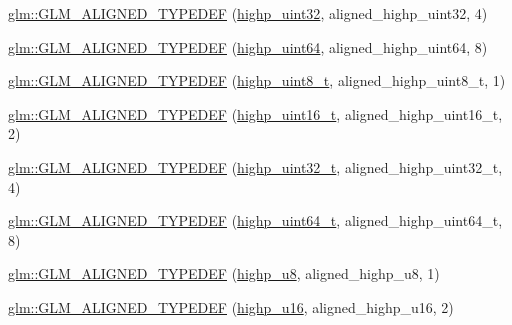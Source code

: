 \begin{DoxyCompactItemize}
\hyperlink{group__gtx__type__aligned_ga6027ae13b2734f542a6e7beee11b8820}{glm\+::\+G\+L\+M\+\_\+\+A\+L\+I\+G\+N\+E\+D\+\_\+\+T\+Y\+P\+E\+D\+EF} (\hyperlink{group__gtc__type__precision_ga3145e44c73e2df7dfe4f3cb65974bf22}{highp\+\_\+uint32}, aligned\+\_\+highp\+\_\+uint32, 4)
\item 
\hyperlink{group__gtx__type__aligned_ga2aca46c8608c95ef991ee4c332acde5f}{glm\+::\+G\+L\+M\+\_\+\+A\+L\+I\+G\+N\+E\+D\+\_\+\+T\+Y\+P\+E\+D\+EF} (\hyperlink{group__gtc__type__precision_ga8079c653e20cda03d34b99de629a7b09}{highp\+\_\+uint64}, aligned\+\_\+highp\+\_\+uint64, 8)
\item 
\hyperlink{group__gtx__type__aligned_gaff50b10dd1c48be324fdaffd18e2c7ea}{glm\+::\+G\+L\+M\+\_\+\+A\+L\+I\+G\+N\+E\+D\+\_\+\+T\+Y\+P\+E\+D\+EF} (\hyperlink{group__gtc__type__precision_ga9ba529fcc75b82d23da979f0ce6e4518}{highp\+\_\+uint8\+\_\+t}, aligned\+\_\+highp\+\_\+uint8\+\_\+t, 1)
\item 
\hyperlink{group__gtx__type__aligned_ga9fc4421dbb833d5461e6d4e59dcfde55}{glm\+::\+G\+L\+M\+\_\+\+A\+L\+I\+G\+N\+E\+D\+\_\+\+T\+Y\+P\+E\+D\+EF} (\hyperlink{group__gtc__type__precision_ga3145bc0ee80432c165e985a188a722b3}{highp\+\_\+uint16\+\_\+t}, aligned\+\_\+highp\+\_\+uint16\+\_\+t, 2)
\item 
\hyperlink{group__gtx__type__aligned_ga329f1e2b94b33ba5e3918197030bcf03}{glm\+::\+G\+L\+M\+\_\+\+A\+L\+I\+G\+N\+E\+D\+\_\+\+T\+Y\+P\+E\+D\+EF} (\hyperlink{group__gtc__type__precision_ga8eb85ad460079c63b68866ae34637bda}{highp\+\_\+uint32\+\_\+t}, aligned\+\_\+highp\+\_\+uint32\+\_\+t, 4)
\item 
\hyperlink{group__gtx__type__aligned_ga71e646f7e301aa422328194162c9c998}{glm\+::\+G\+L\+M\+\_\+\+A\+L\+I\+G\+N\+E\+D\+\_\+\+T\+Y\+P\+E\+D\+EF} (\hyperlink{group__gtc__type__precision_ga6e66f40c5909bfc872b068187fa6029e}{highp\+\_\+uint64\+\_\+t}, aligned\+\_\+highp\+\_\+uint64\+\_\+t, 8)
\item 
\hyperlink{group__gtx__type__aligned_ga8942e09f479489441a7a5004c6d8cb66}{glm\+::\+G\+L\+M\+\_\+\+A\+L\+I\+G\+N\+E\+D\+\_\+\+T\+Y\+P\+E\+D\+EF} (\hyperlink{group__gtc__type__precision_ga8a60abe782749c504fb5ae51eb8b49cc}{highp\+\_\+u8}, aligned\+\_\+highp\+\_\+u8, 1)
\item 
\hyperlink{group__gtx__type__aligned_gaab32497d6e4db16ee439dbedd64c5865}{glm\+::\+G\+L\+M\+\_\+\+A\+L\+I\+G\+N\+E\+D\+\_\+\+T\+Y\+P\+E\+D\+EF} (\hyperlink{group__gtc__type__precision_ga9da2178d7501d9c0f225fa1a7b70cb45}{highp\+\_\+u16}, aligned\+\_\+highp\+\_\+u16, 2)
\item 

\end{DoxyCompactItemize}
